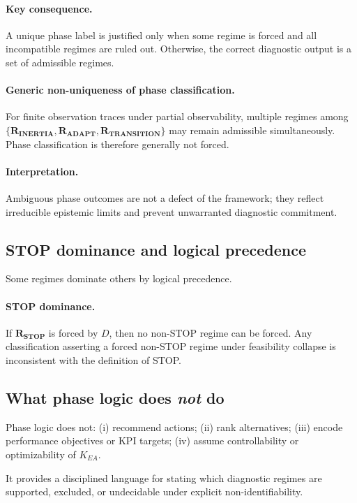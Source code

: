 \paragraph{Key consequence.}
A unique phase label is justified only when some regime is forced and all
incompatible regimes are ruled out.
Otherwise, the correct diagnostic output is a set of admissible regimes.

\paragraph{Generic non-uniqueness of phase classification.}
For finite observation traces under partial observability, multiple regimes among
$\{\mathbf{R_{INERTIA}}, \mathbf{R_{ADAPT}}, \mathbf{R_{TRANSITION}}\}$ may remain
admissible simultaneously.
Phase classification is therefore generally not forced.

\paragraph{Interpretation.}
Ambiguous phase outcomes are not a defect of the framework; they reflect
irreducible epistemic limits and prevent unwarranted diagnostic commitment.

\subsection{STOP dominance and logical precedence}
Some regimes dominate others by logical precedence.

\paragraph{STOP dominance.}
If $\mathbf{R_{STOP}}$ is forced by $D$, then no non-STOP regime can be forced.
Any classification asserting a forced non-STOP regime under feasibility collapse
is inconsistent with the definition of STOP.

\subsection{What phase logic does \emph{not} do}
Phase logic does not:
(i) recommend actions;
(ii) rank alternatives;
(iii) encode performance objectives or KPI targets;
(iv) assume controllability or optimizability of $K_{EA}$.

It provides a disciplined language for stating which diagnostic regimes are
supported, excluded, or undecidable under explicit non-identifiability.
